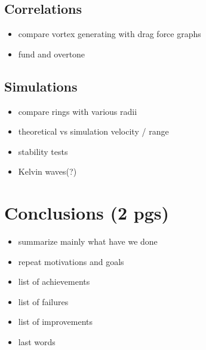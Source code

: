 \documentclass[a4paper, 12pt]{report}
\newcommand{\<}{\langle} %
\renewcommand{\>}{\rangle} %
\begin{document}
\section{Correlations}
\begin{itemize}
	\item compare vortex generating with drag force graphs
	\item fund and overtone
\end{itemize}

\section{Simulations}
\begin{itemize}
	\item compare rings with various radii 
	\item theoretical vs simulation velocity / range
	\item stability tests
	\item Kelvin waves(?)
\end{itemize}

\newpage

\chapter{Conclusions (2 pgs)}

\begin{itemize}
	\item summarize mainly what have we done
	\item repeat motivations and goals
	\item list of achievements
	\item list of failures
	\item list of improvements
	\item last words
\end{itemize}

\newpage


\end{document}
